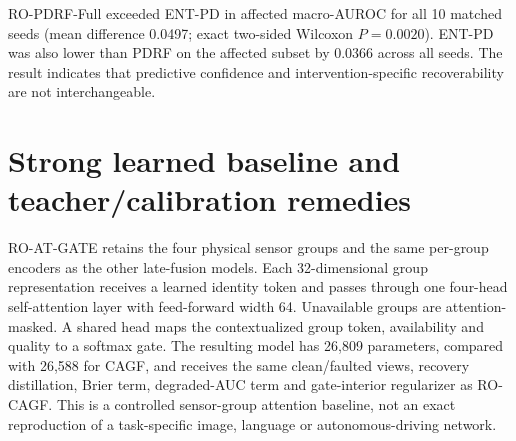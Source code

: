 \documentclass[10pt]{article}
\begin{document}
\begin{table}[H]
\centering
\caption{Paired conditional recovery and error-transfer audit across five fitted RO-PDRF-Full models and eight method-shared fault realizations. The clean-teacher state is taken from the actual Full-model clean forward pass; the baseline state is ordinary PDRF under the matched fault. Rows are repeated predictions from one instrument and are not independent devices.}
\label{tab:supp-teacher-conditional}
\resizebox{0.94\textwidth}{!}{}
\end{table}

\begin{table}[H]
\centering
\caption{Modern uncertainty-weighted comparator under the fixed chemical-array fault. ENT-PD uses normalized per-group predictive entropy for positive fusion weights and otherwise receives the same paired-degradation protocol. Values are means across 10 matched seeds.}
\label{tab:supp-entropy}
\resizebox{\textwidth}{!}{}
\end{table}

RO-PDRF-Full exceeded ENT-PD in affected macro-AUROC for all 10 matched seeds (mean difference 0.0497; exact two-sided Wilcoxon $P=0.0020$). ENT-PD was also lower than PDRF on the affected subset by 0.0366 across all seeds. The result indicates that predictive confidence and intervention-specific recoverability are not interchangeable.

\section{Strong learned baseline and teacher/calibration remedies}

RO-AT-GATE retains the four physical sensor groups and the same per-group encoders as the other late-fusion models. Each 32-dimensional group representation receives a learned identity token and passes through one four-head self-attention layer with feed-forward width 64. Unavailable groups are attention-masked. A shared head maps the contextualized group token, availability and quality to a softmax gate. The resulting model has 26,809 parameters, compared with 26,588 for CAGF, and receives the same clean/faulted views, recovery distillation, Brier term, degraded-AUC term and gate-interior regularizer as RO-CAGF. This is a controlled sensor-group attention baseline, not an exact reproduction of a task-specific image, language or autonomous-driving network.
\end{document}
